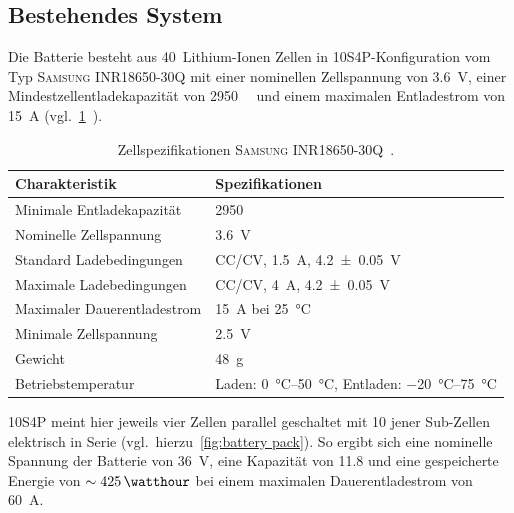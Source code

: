 		\subsection{Bestehendes System}
			Die Batterie besteht aus 40~Lithium-Ionen Zellen in 10S4P-Konfiguration vom Typ \textsc{Samsung INR18650-30Q} mit einer nominellen Zellspannung von \qty{3,6}{\volt}, einer Mindestzellentladekapazität von \qty{2950}{\milli\amperehour} und einem maximalen Entladestrom von \qty{15}{\ampere} (vgl.~\cref{tab:cellspecifications}~\cite{INR18650.30Q.Specs.202202}).
			\begin{table}[h]
				\caption[Zellspezifikationen \textsc{Samsung INR18650-30Q}]{Zellspezifikationen \textsc{Samsung INR18650-30Q}~\cite{INR18650.30Q.Specs.202202}.}%
				\label{tab:cellspecifications}
				\centering
				\begin{tabular}{p{}l}
					\toprule
					Charakteristik				& Spezifikationen \\ \midrule
					Minimale Entladekapazität	& \qty{2950}{\milli\amperehour} \\
					Nominelle Zellspannung		& \qty{3,6}{\volt} \\
					Standard Ladebedingungen	& CC/CV, \qty{1,5}{\ampere}, \qty{4,2 +- 0,05}{\volt} \\
					Maximale Ladebedingungen	& CC/CV, \qty{4}{\ampere}, \qty{4,2 +- 0,05}{\volt} \\
					Maximaler Dauerentladestrom & \qty{15}{\ampere} bei \qty{25}{\degreeCelsius} \\
					Minimale Zellspannung		& \qty{2,5}{\volt} \\
					Gewicht						& \qty{48}{\gram} \\
					Betriebstemperatur			& Laden: \qtyrange{0}{50}{\degreeCelsius}, Entladen: \qtyrange{-20}{75}{\degreeCelsius} \\ \bottomrule
				\end{tabular}
			\end{table}
			10S4P meint hier jeweils vier Zellen parallel geschaltet mit 10 jener Sub-Zellen elektrisch in Serie (vgl.~hierzu~\cref{fig:battery pack}).
			So ergibt sich eine nominelle Spannung der Batterie von \qty{36}{\volt}, eine Kapazität von \qty{11,8}{\amperehour} und eine gespeicherte Energie von \(\sim \SI{425}{\watthour}\) bei einem maximalen Dauerentladestrom von \SI{60}{\ampere}.
